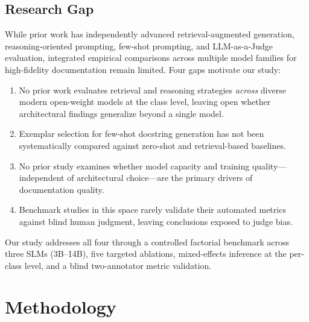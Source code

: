 \documentclass[pdflatex,sn-mathphys-ay]{sn-jnl}%
\theoremstyle{thmstyleone}%
\theoremstyle{thmstyletwo}%
\theoremstyle{thmstylethree}%
\begin{document}
\subsection{Research Gap}
While prior work has independently advanced retrieval-augmented generation, reasoning-oriented prompting, few-shot prompting, and LLM-as-a-Judge evaluation, integrated empirical comparisons across multiple model families for high-fidelity documentation remain limited. Four gaps motivate our study:
\begin{enumerate}
  \item No prior work evaluates retrieval and reasoning strategies \emph{across} diverse modern open-weight models at the class level, leaving open whether architectural findings generalize beyond a single model.
  \item Exemplar selection for few-shot docstring generation has not been systematically compared against zero-shot and retrieval-based baselines.
  \item No prior study examines whether model capacity and training quality---independent of architectural choice---are the primary drivers of documentation quality.
  \item Benchmark studies in this space rarely validate their automated metrics against blind human judgment, leaving conclusions exposed to judge bias.
\end{enumerate}
Our study addresses all four through a controlled factorial benchmark across three SLMs (3B--14B), five targeted ablations, mixed-effects inference at the per-class level, and a blind two-annotator metric validation.

\section{Methodology}
\label{sec:methodology}
\end{document}

